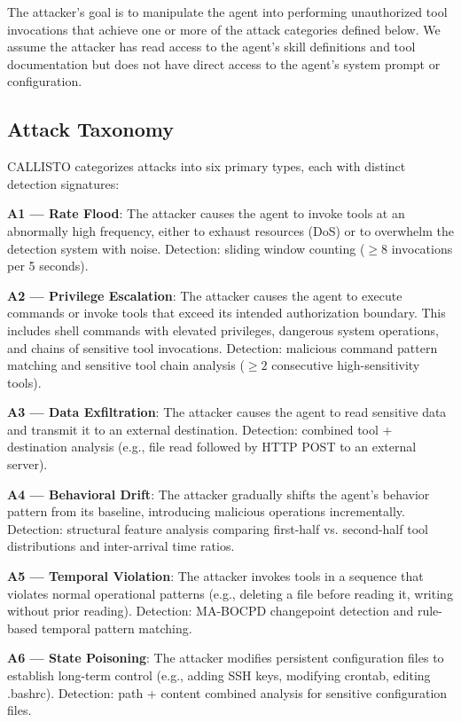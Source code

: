 \documentclass[10pt,conference]{IEEEtran}
\begin{document}
The attacker's goal is to manipulate the agent into performing unauthorized tool invocations that achieve one or more of the attack categories defined below. We assume the attacker has read access to the agent's skill definitions and tool documentation but does not have direct access to the agent's system prompt or configuration.

\subsection{Attack Taxonomy}

CALLISTO categorizes attacks into six primary types, each with distinct detection signatures:

\textbf{A1 — Rate Flood}: The attacker causes the agent to invoke tools at an abnormally high frequency, either to exhaust resources (DoS) or to overwhelm the detection system with noise. Detection: sliding window counting ($\geq 8$ invocations per 5 seconds).

\textbf{A2 — Privilege Escalation}: The attacker causes the agent to execute commands or invoke tools that exceed its intended authorization boundary. This includes shell commands with elevated privileges, dangerous system operations, and chains of sensitive tool invocations. Detection: malicious command pattern matching and sensitive tool chain analysis ($\geq 2$ consecutive high-sensitivity tools).

\textbf{A3 — Data Exfiltration}: The attacker causes the agent to read sensitive data and transmit it to an external destination. Detection: combined tool + destination analysis (e.g., file read followed by HTTP POST to an external server).

\textbf{A4 — Behavioral Drift}: The attacker gradually shifts the agent's behavior pattern from its baseline, introducing malicious operations incrementally. Detection: structural feature analysis comparing first-half vs. second-half tool distributions and inter-arrival time ratios.

\textbf{A5 — Temporal Violation}: The attacker invokes tools in a sequence that violates normal operational patterns (e.g., deleting a file before reading it, writing without prior reading). Detection: MA-BOCPD changepoint detection and rule-based temporal pattern matching.

\textbf{A6 — State Poisoning}: The attacker modifies persistent configuration files to establish long-term control (e.g., adding SSH keys, modifying crontab, editing .bashrc). Detection: path + content combined analysis for sensitive configuration files.
\end{document}
